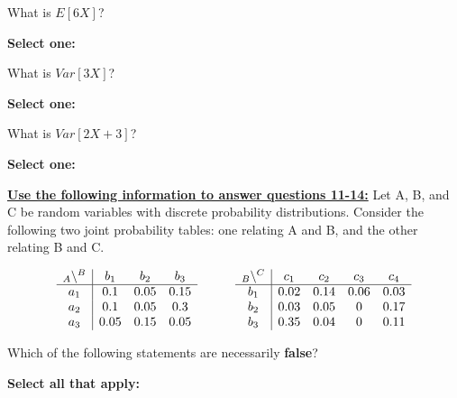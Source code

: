 \documentclass[11pt,addpoints,answers]{exam}
\numberwithin{equation}{section} %
\numberwithin{figure}{section} %
\numberwithin{table}{section} %
\begin{document}
\begin{questions}
    \question[1] What is $E[6X]$?

    \textbf{Select one:}
    \begin{checkboxes}
    \end{checkboxes}


    \question[1] What is $Var[3X]$?

    \textbf{Select one:}
    \begin{checkboxes}
    \end{checkboxes}


    \question[1] What is $Var[2X + 3]$?

    \textbf{Select one:}
    \begin{checkboxes}
    \end{checkboxes}

    \clearpage
    \textbf{\underline{Use the following information to answer questions 11-14:}}
    Let A, B, and C be random variables with discrete probability distributions. Consider the following two joint probability tables: one relating A and B, and the other relating B and C.
    
    $$\begin{array}{c|ccc}
    _{\large A}\backslash^{\large B} & b_1 & b_2 & b_3 \\
    \hline
    a_1 & 0.1 & 0.05 & 0.15 \\
    a_2 & 0.1 & 0.05 & 0.3 \\
    a_3 & 0.05 & 0.15 & 0.05 \\
    \end{array}
    \quad \quad \quad
    \begin{array}{c|cccc}
    _{\large B}\backslash^{\large C} & c_1 & c_2 & c_3 & c_4 \\
    \hline
    b_1 & 0.02 & 0.14 & 0.06 & 0.03 \\
    b_2 & 0.03 & 0.05 & 0 & 0.17 \\
    b_3 & 0.35 & 0.04 & 0 & 0.11 \\
    \end{array}$$

    \question[1] Which of the following statements are necessarily \textbf{false}?
    
    \textbf{Select all that apply:}
    \begin{checkboxes}{%
    \checkboxchar{$\Box$} \checkedchar{$\blacksquare$}

}
\end{checkboxes}
\end{questions}
\end{document}
